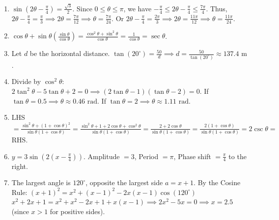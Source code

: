 \documentclass{article}
\begin{document}
\begin{enumerate}
    \item $\sin\left(2\theta - \frac{\pi}{4}\right) = \frac{\sqrt{3}}{2}$. Since $0 \le \theta \le \pi$, we have $-\frac{\pi}{4} \le 2\theta - \frac{\pi}{4} \le \frac{7\pi}{4}$.
    Thus, $2\theta - \frac{\pi}{4} = \frac{\pi}{3} \implies 2\theta = \frac{7\pi}{12} \implies \theta = \frac{7\pi}{24}$.
    Or $2\theta - \frac{\pi}{4} = \frac{2\pi}{3} \implies 2\theta = \frac{11\pi}{12} \implies \theta = \frac{11\pi}{24}$.
    \vspace{0.5cm}

    \item $\cos\theta + \sin\theta\left(\frac{\sin\theta}{\cos\theta}\right) = \frac{\cos^2\theta + \sin^2\theta}{\cos\theta} = \frac{1}{\cos\theta} = \sec\theta$.
    \vspace{0.5cm}

    \item Let $d$ be the horizontal distance. $\tan(20^\circ) = \frac{50}{d} \implies d = \frac{50}{\tan(20^\circ)} \approx 137.4\text{ m}$.
    \vspace{0.5cm}

    \item Divide by $\cos^2 \theta$: $2\tan^2\theta - 5\tan\theta + 2 = 0 \implies (2\tan\theta-1)(\tan\theta-2) = 0$.
    If $\tan\theta = 0.5 \implies \theta \approx 0.46 \text{ rad}$.
    If $\tan\theta = 2 \implies \theta \approx 1.11 \text{ rad}$.
    \vspace{0.5cm}

    \item LHS $= \frac{\sin^2 \theta + (1+\cos\theta)^2}{\sin\theta(1+\cos\theta)} = \frac{\sin^2\theta + 1 + 2\cos\theta + \cos^2\theta}{\sin\theta(1+\cos\theta)} = \frac{2 + 2\cos\theta}{\sin\theta(1+\cos\theta)} = \frac{2(1+\cos\theta)}{\sin\theta(1+\cos\theta)} = 2\csc \theta =$ RHS.
    \vspace{0.5cm}

    \item $y = 3\sin\left(2(x - \frac{\pi}{4})\right)$. Amplitude $= 3$, Period $= \pi$, Phase shift $= \frac{\pi}{4}$ to the right.
    \vspace{0.5cm}

    \item The largest angle is $120^\circ$, opposite the largest side $a = x+1$.
    By the Cosine Rule: $(x+1)^2 = x^2 + (x-1)^2 - 2x(x-1)\cos(120^\circ)$
    $x^2 + 2x + 1 = x^2 + x^2 - 2x + 1 + x(x-1) \implies 2x^2 - 5x = 0 \implies x = 2.5$ (since $x > 1$ for positive sides).
    \vspace{0.5cm}


\end{enumerate}
\end{document}
